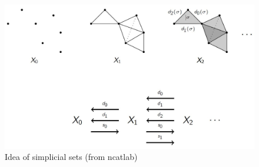 \documentclass[b5paper,10pt]{article}
\begin{document}
\begin{figure}[h]
	\caption{Idea of simplicial sets (from ncatlab)}
\centering\includegraphics[scale=0.5]{PIC/SimplicialSetsIdea.jpg}
\end{figure}
\end{document}
